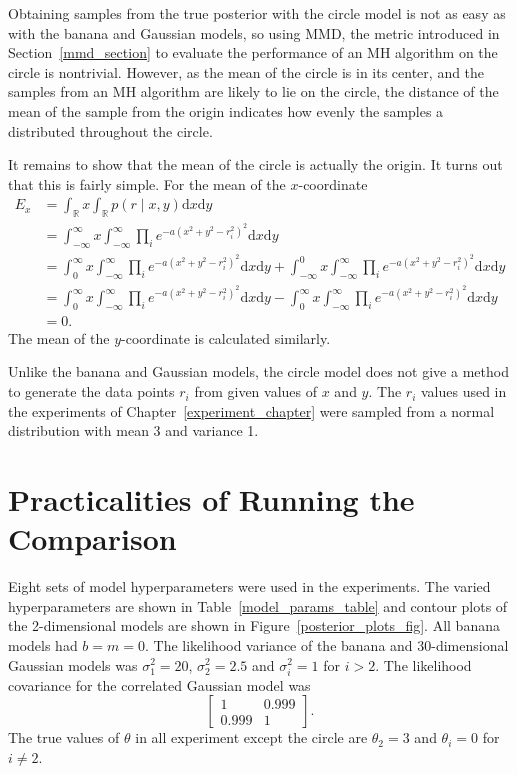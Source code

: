 \documentclass[english,twoside,openright]{HYgraduMLDS}
\newcommand{\R}{\mathbb{R}}
\newcommand{\dx}{\mathrm{d}}
\begin{document}
Obtaining samples from the true posterior with the circle model is not
as easy as with the banana and Gaussian models, so using MMD, the metric
introduced in Section~\ref{mmd_section} to evaluate
the performance of an MH algorithm on the circle is nontrivial. However,
as the mean of the circle is in its center, and the samples from an MH
algorithm are likely to lie on the circle, the distance of the mean of the
sample from the origin indicates how evenly the samples a distributed throughout
the circle.

It remains to show that the mean of the circle is actually the origin. It turns
out that this is fairly simple. For the mean of the \(x\)-coordinate
\begin{align*}
  E_{x} &= \int_{\R} x\int_{\R} p(r\mid x, y)\dx x\dx y
  \\&= \int_{-\infty}^{\infty} x\int_{-\infty}^{\infty}
  \prod_{i} e^{-a(x^{2} + y^{2} - r_{i}^{2})^{2}}\dx x\dx y
  \\&= \int_{0}^{\infty} x\int_{-\infty}^{\infty}
  \prod_{i} e^{-a(x^{2} + y^{2} - r_{i}^{2})^{2}}\dx x\dx y
  + \int_{-\infty}^{0}x\int_{-\infty}^{\infty}
  \prod_{i} e^{-a(x^{2} + y^{2} - r_{i}^{2})^{2}}\dx x\dx y
  \\&= \int_{0}^{\infty} x\int_{-\infty}^{\infty}
  \prod_{i} e^{-a(x^{2} + y^{2} - r_{i}^{2})^{2}}\dx x\dx y
  - \int_{0}^{\infty} x\int_{-\infty}^{\infty}
  \prod_{i} e^{-a(x^{2} + y^{2} - r_{i}^{2})^{2}}\dx x\dx y
  \\&= 0.
\end{align*}
The mean of the \(y\)-coordinate is calculated similarly.

Unlike the banana and Gaussian models,
the circle model does not give a method to generate the data points
\(r_{i}\) from given values of \(x\) and \(y\). The \(r_{i}\) values used
in the experiments of Chapter~\ref{experiment_chapter} were sampled
from a normal distribution with mean 3 and variance 1.

\section{Practicalities of Running the Comparison}\label{practical_section}

Eight sets of model hyperparameters were used in the experiments.
The varied hyperparameters are shown in
Table~\ref{model_params_table} and contour plots of the
2-dimensional models are shown in Figure~\ref{posterior_plots_fig}.
All banana models had \(b = m = 0\). The likelihood variance of the banana
and 30-dimensional Gaussian
models was \(\sigma_{1}^{2} = 20\), \(\sigma_{2}^{2} = 2.5\) and
\(\sigma_{i}^{2} = 1\)
for \(i > 2\). The likelihood covariance for the correlated Gaussian model
was
\[
\begin{bmatrix}
  1 & 0.999 \\
  0.999 & 1
\end{bmatrix}.
\]
The true values of \(\theta\) in all experiment except the circle are
\(\theta_{2} = 3\) and \(\theta_{i} = 0\) for \(i \neq 2\).
\end{document}
